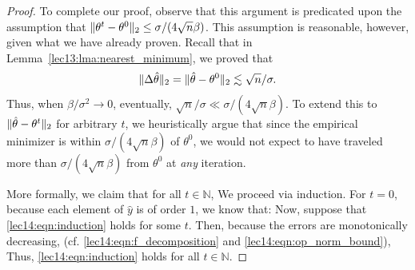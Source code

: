 \begin{proof}
To complete our proof, observe that this argument is predicated upon the assumption that $\|\theta^t - \theta^0\|_2 \leq \sigma/(4\sqrt{n}\beta)$. This assumption is reasonable, however, given what we have already proven. Recall that in Lemma~\ref{lec13:lma:nearest_minimum}, we proved that 
\begin{align}
    \|\Delta \hat{\theta}\|_2 = \|\hat{\theta} - \theta^{0}\|_2 \lesssim \sqrt{n}/\sigma.
\end{align}
Thus, when $\beta/\sigma^2 \rightarrow 0$, eventually, $\sqrt{n}/\sigma \ll \sigma/(4\sqrt{n}\beta)$. To extend this to $\|\hat{\theta} - \theta^t\|_2$ for arbitrary $t$, we heuristically argue that since the empirical minimizer is within $\sigma/(4\sqrt{n}\beta)$ of $\theta^0$, we would not expect to have traveled more than $\sigma/(4\sqrt{n}\beta)$ from $\theta^0$ at \emph{any} iteration. 

More formally, we claim that for all $t \in \mathbb{N}$, 
We proceed via induction. For $t=0$, because each element of $\hat{y}$ is of order $1$, we know that: 
Now, suppose that \eqref{lec14:eqn:induction} holds for some $t$. Then, because the errors are monotonically decreasing, (cf. \eqref{lec14:eqn:f_decomposition} and \eqref{lec14:eqn:op_norm_bound}), 
Thus, \eqref{lec14:eqn:induction} holds for all $t \in \mathbb{N}$. 


\end{proof}
